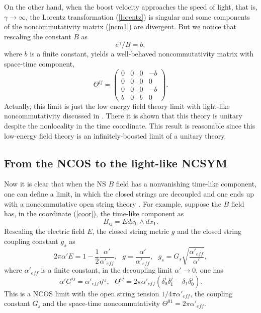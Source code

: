 \documentclass[a4paper,12pt]{article}
\begin{document}
On the other
hand, when the boost velocity approaches the speed of light, that is,
$\gamma \to \infty$, the Lorentz transformation (\ref{lorentz}) is
singular and some components of the noncommutativity matrix (\ref{ncm1})
are divergent. But we notice that rescaling the constant $B$ as
\begin{equation}
e^{\gamma}/B = b,
\end{equation}
where $b$ is a finite constant, yields a well-behaved
noncommutativity matrix with space-time component,
\begin{equation}
\Theta^{ij}= \left (
\begin{array}{cccc}
0 & 0& 0& -b \\
0 & 0& 0& 0 \\
0 & 0& 0& -b \\
b &0& b &0
\end{array}
\right).
\end{equation}
Actually, this limit is just the low energy field theory limit with
light-like noncommutativity discussed in \cite{AGM}. There it is
shown that this theory is unitary despite the nonlocality in the
time coordinate. This result is reasonable since this low-energy field
theory is an infinitely-boosted limit of a unitary theory.


\subsection{From the NCOS to the light-like NCSYM}

Now it is clear that when the NS $B$ field has a nonvanishing time-like
component, one can define a limit, in which the closed strings are decoupled
and one ends up with a noncommutative open string theory \cite{Seib2,Gopa1}.
 For example, suppose the $B$ field
has, in the coordinate (\ref{coor}), the time-like component as
\begin{equation}
B_{ij}=E dx_0 \wedge dx_1.
\end{equation}
Rescaling the electric field $E$, the closed string metric $g$ and the
closed string coupling constant $g_s$ as
\begin{equation}
\label{ncos}
2\pi \alpha' E =1-\frac{1}{2}\frac{\alpha'}{\alpha'_{eff}},\ \ \
 g=\frac{\alpha'}{\alpha'_{eff}}, \ \ \ g_s=G_s\sqrt{\frac{\alpha'_{eff}}
{\alpha'}},
\end{equation}
where $\alpha'_{eff}$ is a finite constant, in the decoupling limit
$\alpha' \to 0$, one has
\begin{equation}
\alpha' G^{ij}=\alpha'_{eff}\eta^{ij}, \ \ \ \Theta^{ij}=2\pi \alpha'_{eff}
 (\delta^i_0\delta^j_1-\delta_1\delta^j_0).
\end{equation}
This is a NCOS limit with the open string tension $1/4\pi\alpha'_{eff}$, the
coupling constant $G_s$ and the space-time noncommutativity $\Theta ^{01}
= 2\pi \alpha'_{eff}$.
\end{document}
